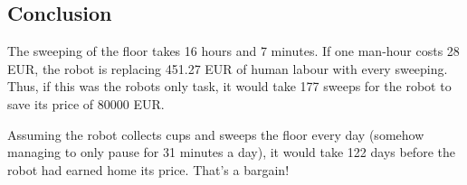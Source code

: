 \subsection{Conclusion}
The sweeping of the floor takes 16 hours and 7 minutes.
If one man-hour costs 28 EUR, the robot is replacing 451.27 EUR of human labour
with every sweeping.
Thus, if this was the robots only task, it would take 177 sweeps for the robot to save its price of 80000 EUR.

Assuming the robot collects cups and sweeps the floor every day
(somehow managing to only pause for 31 minutes a day),
it would take 122 days before the robot had earned home its price.
That's a bargain!